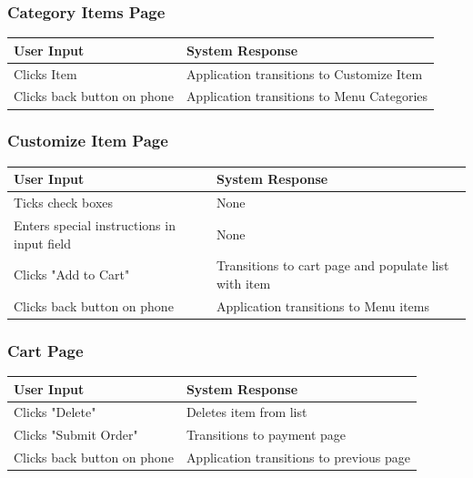 \documentclass[12pt, titlepage]{article}
\begin{document}
\subsubsection{Category Items Page}
\begin{center}
    \begin{tabular}{ | l | p{10cm} |}
    \hline
    User Input & System Response \\ \hline
    Clicks Item & Application transitions to Customize Item \\ \hline
    Clicks back button on phone & Application transitions to Menu Categories \\
    \hline
    \end{tabular}
\end{center}


\subsubsection{Customize Item Page}
\begin{center}
    \begin{tabular}{ | l | p{8cm} |}
    \hline
    User Input & System Response \\ \hline
    Ticks check boxes & None \\ \hline
    Enters special instructions in input field & None \\ \hline
    Clicks "Add to Cart" & Transitions to cart page and populate list with item \\ \hline
    Clicks back button on phone & Application transitions to Menu items \\
    \hline
    \end{tabular}
\end{center}

\subsubsection{Cart Page}
\begin{center}
    \begin{tabular}{ | l | p{10cm} |}
    \hline
    User Input & System Response \\ \hline
 	Clicks "Delete" &  Deletes item from list\\ \hline
    Clicks "Submit Order" &  Transitions to payment page\\ \hline
    Clicks back button on phone & Application transitions to previous page \\
    \hline
    \end{tabular}
\end{center}
\end{document}
